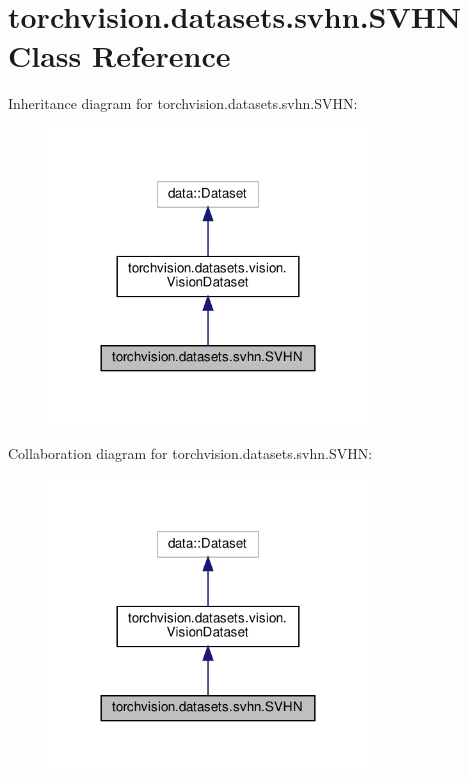 \hypertarget{classtorchvision_1_1datasets_1_1svhn_1_1SVHN}{}\section{torchvision.\+datasets.\+svhn.\+S\+V\+HN Class Reference}
\label{classtorchvision_1_1datasets_1_1svhn_1_1SVHN}


Inheritance diagram for torchvision.\+datasets.\+svhn.\+S\+V\+HN\+:
\nopagebreak
\begin{figure}[H]
\begin{center}
\leavevmode
\includegraphics[width=240pt]{classtorchvision_1_1datasets_1_1svhn_1_1SVHN__inherit__graph}
\end{center}
\end{figure}


Collaboration diagram for torchvision.\+datasets.\+svhn.\+S\+V\+HN\+:
\nopagebreak
\begin{figure}[H]
\begin{center}
\leavevmode
\includegraphics[width=240pt]{classtorchvision_1_1datasets_1_1svhn_1_1SVHN__coll__graph}
\end{center}
\end{figure}
